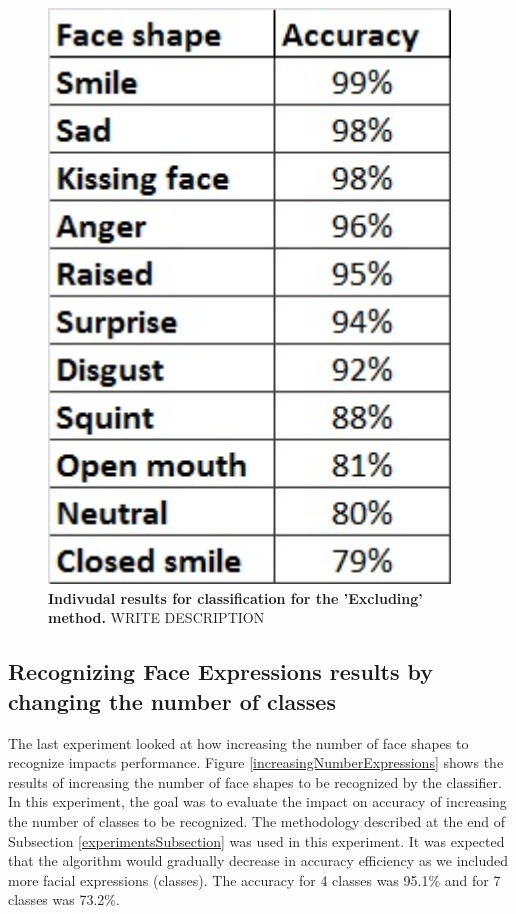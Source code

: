 \documentclass[]{article}
\begin{document}
\begin{figure}[ht]
\begin{center}
\vspace{-3mm}
\includegraphics[width=0.95\textwidth]{figures/rankExcluding.jpg}
\end{center}
\caption{\textbf{Indivudal results for classification for the 'Excluding'
method.} WRITE DESCRIPTION }
\label{raExcluding}
\end{figure}

 
\subsection{Recognizing Face Expressions results by changing the number of classes}
The last experiment looked at how increasing the number of face shapes to recognize impacts performance. Figure
\ref{increasingNumberExpressions} shows the results of increasing the number of face shapes to be recognized by the
classifier. In this experiment, the goal was to evaluate the impact on accuracy of increasing  the number of classes to
be recognized. The methodology described at the end of Subsection \ref{experimentsSubsection} was used in this
experiment. It was expected that the algorithm would gradually decrease in accuracy efficiency as we included more
facial expressions (classes). The accuracy for 4 classes was 95.1\% and for 7 classes was 73.2\%.
\end{document}
